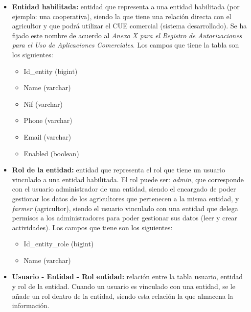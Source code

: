 \begin{itemize}
    \begin{itemize}
        \item Id\_user (bigint)
        \item Id\_role (bigint)
    \end{itemize}
    
    \item \textbf{Entidad habilitada:} entidad que representa a una entidad habilitada (por ejemplo: una cooperativa), siendo la que tiene una relación directa con el agricultor
    y que podrá utilizar el CUE comercial (sistema desarrollado). Se ha fijado este nombre de acuerdo al \textit{Anexo X para el Registro de Autorizaciones para el Uso de 
    Aplicaciones Comerciales}. Los campos que tiene la tabla son los siguientes:

    \begin{itemize}
        \item Id\_entity (bigint)
        \item Name (varchar)
        \item Nif (varchar)
        \item Phone (varchar)
        \item Email (varchar)
        \item Enabled (boolean)
    \end{itemize}
    
    \item \textbf{Rol de la entidad:} entidad que representa el rol que tiene un usuario vinculado a una entidad habilitada. El rol puede ser: \textit{admin}, que corresponde con
    el usuario administrador de una entidad, siendo el encargado de poder gestionar los datos de los agricultores que pertenecen a la misma entidad, y \textit{farmer} (agricultor),
    siendo el usuario vinculado con una entidad que delega permisos a los administradores para poder gestionar sus datos (leer y crear actividades). Los campos que tiene son los
    siguientes:

    \begin{itemize}
        \item Id\_entity\_role (bigint)
        \item Name (varchar)
    \end{itemize}
    
    \item \textbf{Usuario - Entidad - Rol entidad:} relación entre la tabla usuario, entidad y rol de la entidad. Cuando un usuario es vinculado con una entidad, se le añade un rol
    dentro de la entidad, siendo esta relación la que almacena la información.


\end{itemize}
